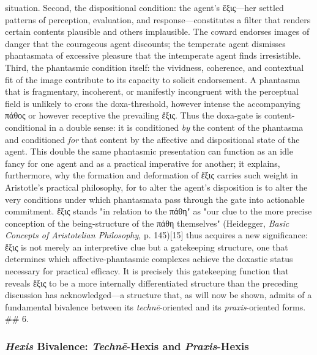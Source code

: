 \documentclass{article}
\begin{document}
situation. Second, the dispositional condition: the agent's ἕξις—her settled patterns of perception, evaluation, and response—constitutes a filter that renders certain contents plausible and others implausible. The coward endorses images of danger that the courageous agent discounts; the temperate agent dismisses phantasmata of excessive pleasure that the intemperate agent finds irresistible. Third, the phantasmic condition itself: the vividness, coherence, and contextual fit of the image contribute to its capacity to solicit endorsement. A phantasma that is fragmentary, incoherent, or manifestly incongruent with the perceptual field is unlikely to cross the doxa-threshold, however intense the accompanying πάθος or however receptive the prevailing ἕξις. Thus the doxa-gate is content-conditional in a double sense: it is conditioned \textit{by} the content of the phantasma and conditioned \textit{for} that content by the affective and dispositional state of the agent. This double the same phantasmic presentation can function as an idle fancy for one agent and as a practical imperative for another; it explains, furthermore, why the formation and deformation of ἕξις carries such weight in Aristotle's practical philosophy, for to alter the agent's disposition is to alter the very conditions under which phantasmata pass through the gate into actionable commitment. ἕξις stands "in relation to the πάθη" as "our clue to the more precise conception of the being-structure of the πάθη themselves" (Heidegger, \textit{Basic Concepts of Aristotelian Philosophy}, p. 145)[15] thus acquires a new significance: ἕξις is not merely an interpretive clue but a gatekeeping structure, one that determines which affective-phantasmic complexes achieve the doxastic status necessary for practical efficacy. It is precisely this gatekeeping function that reveals ἕξις to be a more internally differentiated structure than the preceding discussion has acknowledged—a structure that, as will now be shown, admits of a fundamental bivalence between its \textit{technē}-oriented and its \textit{praxis}-oriented forms. ## 6. 

\subsubsection*{\textit{Hexis} Bivalence: \textit{Technē}-Hexis and \textit{Praxis}-Hexis}
\end{document}
